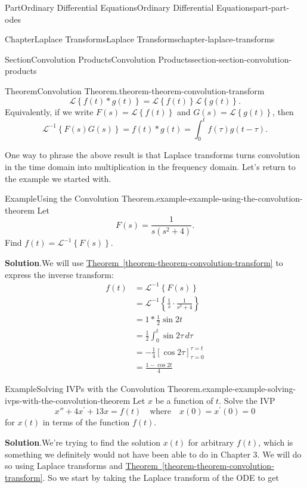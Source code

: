 \documentclass[twoside,10pt,]{book}
\newcommand{\blocktitlefont}{\relax}
\newcommand{\xreffont}{\relax}
\numberwithin{equation}{part}
\newcommand{\Laplace}[1]{\mathcal{L}\set{#1}}
\newcommand{\iLaplace}[1]{\mathcal{L}^{-1}\set{#1}}
\newcommand{\set}[1]{\left\{ #1 \right\}}
\newcommand{\qq}[1]{\quad\text{#1}\quad}
\begin{document}
\begin{partptx}{Part}{Ordinary Differential Equations}{}{Ordinary Differential Equations}{}{}{part-part-odes}
\begin{chapterptx}{Chapter}{Laplace Transforms}{}{Laplace Transforms}{}{}{chapter-laplace-transforms}
\begin{sectionptx}{Section}{Convolution Products}{}{Convolution Products}{}{}{section-section-convolution-products}
\begin{theorem}{Theorem}{Convolution Theorem.}{}{theorem-theorem-convolution-transform}
\begin{equation*}
\Laplace{f(t)\ast g(t)} = \Laplace{f(t)}\Laplace{g(t)}\text{.}
\end{equation*}
Equivalently, if we write \(F(s) = \Laplace{f(t)}\) and \(G(s) = \Laplace{g(t)}\), then%
\begin{equation*}
\iLaplace{F(s)G(s)} = f(t)\ast g(t) = \int_{0}^{t}f(\tau)g(t-\tau)\text{.}
\end{equation*}
%
\end{theorem}
One way to phrase the above result is that Laplace transforms turns convolution in the time domain into multiplication in the frequency domain. Let's return to the example we started with.%
\begin{example}{Example}{Using the Convolution Theorem.}{example-example-using-the-convolution-theorem}%
Let%
\begin{equation*}
F(s) = \frac{1}{s(s^{2}+4)}.
\end{equation*}
Find \(f(t) = \iLaplace{F(s)}\).%
\par\smallskip%
\noindent\textbf{\blocktitlefont Solution}.\hypertarget{solution-example-using-the-convolution-theorem-c}{}\quad{}We will use \hyperref[theorem-theorem-convolution-transform]{Theorem~{\xreffont\ref{theorem-theorem-convolution-transform}}} to express the inverse transform:%
\begin{align*}
f(t) &= \iLaplace{F(s)}\\
&= \iLaplace{\frac{1}{s}\cdot\frac{1}{s^{2}+4}}\\
&= 1\ast \frac{1}{2}\sin2t\\
&= \frac{1}{2}\int_{0}^{t}\sin2\tau\,d\tau\\
&= -\frac{1}{4}\left[\cos2\tau\right]_{\tau=0}^{\tau=t}\\
&= \frac{1-\cos2t}{4}
\end{align*}
%
\end{example}
\begin{example}{Example}{Solving IVPs with the Convolution Theorem.}{example-example-solving-ivps-with-the-convolution-theorem}%
Let \(x\) be a function of \(t\). Solve the IVP%
\begin{equation*}
x''+4x^{\prime}+13x = f(t)\qq{where}x(0) = x^{\prime}(0) = 0
\end{equation*}
for \(x(t)\) in terms of the function \(f(t)\).%
\par\smallskip%
\noindent\textbf{\blocktitlefont Solution}.\hypertarget{solution-example-solving-ivps-with-the-convolution-theorem-c}{}\quad{}We're trying to find the solution \(x(t)\) for arbitrary \(f(t)\), which is something we definitely would not have been able to do in Chapter 3. We will do so using Laplace transforms and \hyperref[theorem-theorem-convolution-transform]{Theorem~{\xreffont\ref{theorem-theorem-convolution-transform}}}. So we start by taking the Laplace transform of the ODE to get%

\end{example}
\end{sectionptx}
\end{chapterptx}
\end{partptx}
\end{document}
